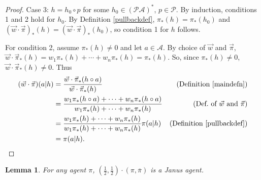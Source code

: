\documentclass{article}
\newtheorem{lemma}[theorem]{Lemma}
\begin{document}
\begin{proof}
    Case 3: $h=h_0\circ p$ for some $h_0\in (\mathcal P\mathcal A)^*$,
        $p\in\mathcal P$.
        By induction, conditions 1 and 2 hold for $h_0$.
        By Definition \ref{pullbackdef},
        $\pi_*(h)=\pi_*(h_0)$ and $(\vec w\cdot\vec\pi)_*(h)=(\vec w\cdot\vec\pi)_*(h_0)$,
        so condition 1 for $h$ follows.

        For condition 2,
        assume $\pi_*(h)\not=0$ and let $a\in\mathcal A$.
        By choice of $\vec w$ and $\vec\pi$,
        $\vec w\cdot\vec\pi_*(h)=w_1\pi_*(h)+\cdots+w_n\pi_*(h)=\pi_*(h)$.
        So, since $\pi_*(h)\not=0$, $\vec w\cdot\vec\pi_*(h)\not=0$.
        Thus
        \begin{align*}
            (\vec w\cdot\vec\pi)(a|h)
                &= \frac{\vec w\cdot \vec\pi_*(h\circ a)}{\vec w\cdot\vec\pi_*(h)}
                    &\mbox{(Definition \ref{maindefn})}\\
                &= \frac{w_1\pi_*(h\circ a)+\cdots+w_n\pi_*(h\circ a)}
                    {w_1\pi_*(h)+\cdots+w_n\pi_*(h)}
                    &\mbox{(Def.\ of $\vec w$ and $\vec\pi$)}\\
                &= \frac{w_1\pi_*(h)+\cdots+w_n\pi_*(h)}{w_1\pi_*(h)+\cdots+w_n\pi_*(h)}
                    \pi(a|h)
                    &\mbox{(Definition \ref{pullbackdef})}\\
                &= \pi(a|h).
        \end{align*}
\end{proof}

\begin{lemma}
\label{reflectionmakesjanuslemma}
    For any agent $\pi$,
    $(\frac12,\frac12)\cdot(\pi,\overline\pi)$ is a Janus agent.
\end{lemma}
\end{document}
